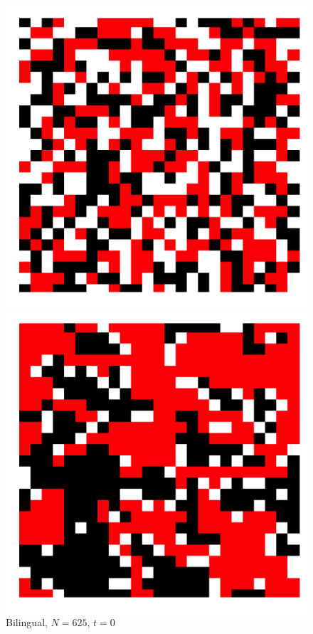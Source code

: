 \begin{figure}[h]
\centering
\begin{minipage}[t]{0.4\linewidth}
    \centering
    \includegraphics[width=\textwidth]{images/task29/smallw_bi_t=1.png} 
    \caption{\scriptsize Bilingual, \(N=625\), \(t=0\)}
    \label{reg_net_bi1}
\end{minipage}
\hfill
\begin{minipage}[t]{0.4\linewidth}
    \centering
    \includegraphics[width=\textwidth]{images/task29/smallw_bi_t=5000.png} 

\end{minipage}
\end{figure}
